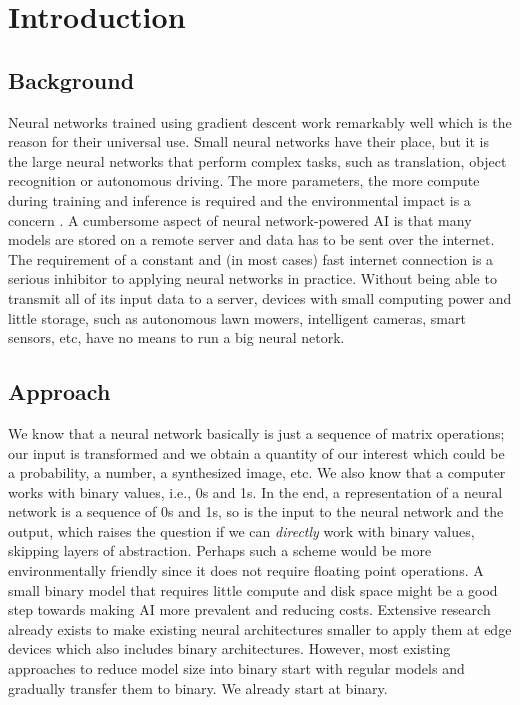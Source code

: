 \section{Introduction}

\subsection{Background}
Neural networks trained using gradient descent work remarkably well which is the reason for their universal use. Small neural networks have their place, but it is the large neural networks that perform complex tasks, such as translation, object recognition or autonomous driving. The more parameters, the more compute during training and inference is required and the environmental impact is a concern \cite{bib:schwartz2020green}. A cumbersome aspect of neural network-powered AI is that many models are stored on a remote server and data has to be sent over the internet. The requirement of a constant and (in most cases) fast internet connection is a serious inhibitor to applying neural networks in practice. Without being able to transmit all of its input data to a server, devices with small computing power and little storage, such as autonomous lawn mowers, intelligent cameras, smart sensors, etc, have no means to run a big neural netork.

\subsection{Approach}
We know that a neural network basically is just a sequence of matrix operations; our input is transformed and we obtain a quantity of our interest which could be a probability, a number, a synthesized image, etc. We also know that a computer works with binary values, i.e., 0s and 1s. In the end, a representation of a neural network is a sequence of 0s and 1s, so is the input to the neural network and the output, which raises the question if we can \textit{directly} work with binary values, skipping layers of abstraction. Perhaps such a scheme would be more environmentally friendly since it does not require floating point operations. A small binary model that requires little compute and disk space might be a good step towards making AI more prevalent and reducing costs. Extensive research already exists to make existing neural architectures smaller to apply them at edge devices \cite{bib:liu2021bringing} which also includes binary architectures. However, most existing approaches to reduce model size into binary start with regular models and gradually transfer them to binary. We already start at binary.

